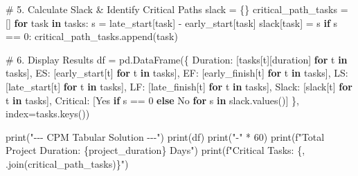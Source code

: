 \documentclass[
  letterpaper,
  DIV=11,
  numbers=noendperiod]{scrreprt}
\newenvironment{Shaded}{\begin{snugshade}}{\end{snugshade}}
\newcommand{\BuiltInTok}[1]{\textcolor[rgb]{0.00,0.23,0.31}{#1}}
\newcommand{\CommentTok}[1]{\textcolor[rgb]{0.37,0.37,0.37}{#1}}
\newcommand{\ControlFlowTok}[1]{\textcolor[rgb]{0.00,0.23,0.31}{\textbf{#1}}}
\newcommand{\DecValTok}[1]{\textcolor[rgb]{0.68,0.00,0.00}{#1}}
\newcommand{\KeywordTok}[1]{\textcolor[rgb]{0.00,0.23,0.31}{\textbf{#1}}}
\newcommand{\NormalTok}[1]{\textcolor[rgb]{0.00,0.23,0.31}{#1}}
\newcommand{\OperatorTok}[1]{\textcolor[rgb]{0.37,0.37,0.37}{#1}}
\newcommand{\SpecialCharTok}[1]{\textcolor[rgb]{0.37,0.37,0.37}{#1}}
\newcommand{\SpecialStringTok}[1]{\textcolor[rgb]{0.13,0.47,0.30}{#1}}
\newcommand{\StringTok}[1]{\textcolor[rgb]{0.13,0.47,0.30}{#1}}
\begin{document}
\begin{Shaded}
\begin{Highlighting}[]
\CommentTok{\# 5. Calculate Slack \& Identify Critical Paths}
\NormalTok{slack }\OperatorTok{=}\NormalTok{ \{\}}
\NormalTok{critical\_path\_tasks }\OperatorTok{=}\NormalTok{ []}
\ControlFlowTok{for}\NormalTok{ task }\KeywordTok{in}\NormalTok{ tasks:}
\NormalTok{    s }\OperatorTok{=}\NormalTok{ late\_start[task] }\OperatorTok{{-}}\NormalTok{ early\_start[task]}
\NormalTok{    slack[task] }\OperatorTok{=}\NormalTok{ s}
    \ControlFlowTok{if}\NormalTok{ s }\OperatorTok{==} \DecValTok{0}\NormalTok{:}
\NormalTok{        critical\_path\_tasks.append(task)}

\CommentTok{\# 6. Display Results}
\NormalTok{df }\OperatorTok{=}\NormalTok{ pd.DataFrame(\{}
    \StringTok{\textquotesingle{}Duration\textquotesingle{}}\NormalTok{: [tasks[t][}\StringTok{\textquotesingle{}duration\textquotesingle{}}\NormalTok{] }\ControlFlowTok{for}\NormalTok{ t }\KeywordTok{in}\NormalTok{ tasks],}
    \StringTok{\textquotesingle{}ES\textquotesingle{}}\NormalTok{: [early\_start[t] }\ControlFlowTok{for}\NormalTok{ t }\KeywordTok{in}\NormalTok{ tasks],}
    \StringTok{\textquotesingle{}EF\textquotesingle{}}\NormalTok{: [early\_finish[t] }\ControlFlowTok{for}\NormalTok{ t }\KeywordTok{in}\NormalTok{ tasks],}
    \StringTok{\textquotesingle{}LS\textquotesingle{}}\NormalTok{: [late\_start[t] }\ControlFlowTok{for}\NormalTok{ t }\KeywordTok{in}\NormalTok{ tasks],}
    \StringTok{\textquotesingle{}LF\textquotesingle{}}\NormalTok{: [late\_finish[t] }\ControlFlowTok{for}\NormalTok{ t }\KeywordTok{in}\NormalTok{ tasks],}
    \StringTok{\textquotesingle{}Slack\textquotesingle{}}\NormalTok{: [slack[t] }\ControlFlowTok{for}\NormalTok{ t }\KeywordTok{in}\NormalTok{ tasks],}
    \StringTok{\textquotesingle{}Critical\textquotesingle{}}\NormalTok{: [}\StringTok{\textquotesingle{}Yes\textquotesingle{}} \ControlFlowTok{if}\NormalTok{ s }\OperatorTok{==} \DecValTok{0} \ControlFlowTok{else} \StringTok{\textquotesingle{}No\textquotesingle{}} \ControlFlowTok{for}\NormalTok{ s }\KeywordTok{in}\NormalTok{ slack.values()]}
\NormalTok{\}, index}\OperatorTok{=}\NormalTok{tasks.keys())}

\BuiltInTok{print}\NormalTok{(}\StringTok{"{-}{-}{-} CPM Tabular Solution {-}{-}{-}"}\NormalTok{)}
\BuiltInTok{print}\NormalTok{(df)}
\BuiltInTok{print}\NormalTok{(}\StringTok{"{-}"} \OperatorTok{*} \DecValTok{60}\NormalTok{)}
\BuiltInTok{print}\NormalTok{(}\SpecialStringTok{f"Total Project Duration: }\SpecialCharTok{\{}\NormalTok{project\_duration}\SpecialCharTok{\}}\SpecialStringTok{ Days"}\NormalTok{)}
\BuiltInTok{print}\NormalTok{(}\SpecialStringTok{f"Critical Tasks: }\SpecialCharTok{\{}\StringTok{\textquotesingle{}, \textquotesingle{}}\SpecialCharTok{.}\NormalTok{join(critical\_path\_tasks)}\SpecialCharTok{\}}\SpecialStringTok{"}\NormalTok{)}
\end{Highlighting}
\end{Shaded}
\end{document}
